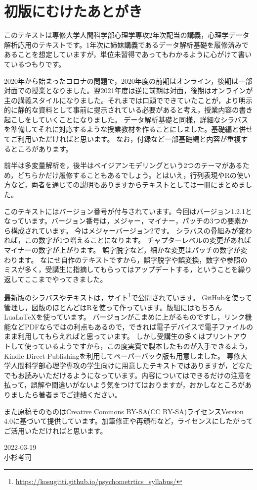 \section*{初版にむけたあとがき}

このテキストは専修大学人間科学部心理学専攻2年次配当の講義，心理学データ解析応用のテキストです。1年次に姉妹講義であるデータ解析基礎を履修済みであることを想定していますが，単位未習得であってもわかるように心がけて書いているつもりです。

2020年から始まったコロナの問題で，2020年度の前期はオンライン，後期は一部対面での授業となりました。翌2021年度は逆に前期は対面，後期はオンラインが主の講義スタイルになりました。それまでは口頭でできていたことが，より明示的に静的な資料として事前に提示されている必要があると考え，授業内容の書き起こしをしていくことになりました。
データ解析基礎と同様，詳細なシラバスを準備してそれに対応するような授業教材を作ることにしました。基礎編と併せてご利用いただければと思います。
なお，付録など一部基礎編と内容が重複するところがあります。

前半は多変量解析を，後半はベイジアンモデリングという2つのテーマがあるため，どちらかだけ履修することもあるでしょう。とはいえ，行列表現やRの使い方など，両者を通じての説明もありますからテキストとしては一冊にまとめました。



このテキストにはバージョン番号が付与されています。今回はバージョン1.2.1となっています。バージョン番号は，メジャー，マイナー，パッチの3つの要素から構成されています。
今はメジャーバージョン2です。
シラバスの骨組みが変われば，この数字が1つ増えることになります。
チャプターレベルの変更があればマイナーの数字が上がります。
誤字脱字など，細かな変更はパッチの数字が変わります。
なにせ自作のテキストですから，誤字脱字や誤変換，数字や参照のミスが多く，受講生に指摘してもらってはアップデートする，ということを繰り返してここまでやってきました。


最新版のシラバスやテキストは，サイト\footnote{\url{https://kosugitti.github.io/psychometrtics_syllabus/}}で公開されています。
GitHubを使って管理し，図版のほとんどはRを使って作っています。版組にはもちろんLua\LaTeX を使っています。
バージョンがこまめに上がるものですし，リンク機能などPDFならではの利点もあるので，できれば電子デバイスで電子ファイルのまま利用してもらえればと思っています。
しかし受講生の多くはプリントアウトして使っているようですから，この度実費で製本したものが入手できるよう，Kindle Direct Publishingを利用してペーパーバック版も用意しました。
専修大学人間科学部心理学専攻の学生向けに用意したテキストではありますが，どなたでもお読みいただけるようになっています。内容についてはできるだけの注意を払って，誤解や間違いがないよう気をつけてはおりますが，おかしなところがありましたら著者までご連絡ください。

また原稿そのものはCreative Commons BY-SA(CC BY-SA)ライセンスVersion 4.0に基づいて提供しています。加筆修正や再頒布など，ライセンスにしたがってご活用いただければと思います。


\begin{flushright}
	2022-03-19\\
	小杉考司
\end{flushright}